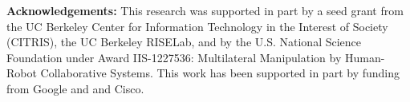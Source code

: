 \documentclass[sigconf]{acmart}
\begin{document}
\maketitle










%
%
%
%
%
%
%
% 

% 

%
%
%
%
%
%
%
%
%


%

\vspace{0.5em}
\noindent \textbf{Acknowledgements: }
This research was supported in part by a seed grant from the UC Berkeley Center for Information Technology in the Interest of Society (CITRIS), the UC Berkeley RISELab, and by the U.S. National Science Foundation under Award IIS-1227536: Multilateral Manipulation by Human-Robot Collaborative Systems. This work has been supported in part by funding from Google and and Cisco.



 
\normalsize \selectfont
%
\end{document}
